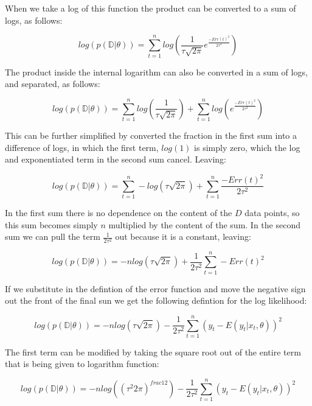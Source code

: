 \documentclass[12pt,a4paper]{article}
\numberwithin{equation}{section}
\begin{document}
When we take a log of this function the product can be converted to a sum of logs, as follows:

\begin{equation}
log(p(\mathbb{D} | \theta)) = \sum_{t=1}^n log( \frac{1}{\tau \sqrt{2\pi}} e^{\frac{-Err(t)^2}{2\tau^2}} )
\end{equation}

The product inside the internal logarithm can also be converted in a sum of logs, and separated, as follows:

\begin{equation}
log(p(\mathbb{D} | \theta)) = \sum_{t=1}^n log( \frac{1}{\tau \sqrt{2\pi}}) + \sum_{t=1}^n log( e^{\frac{-Err(t)^2}{2\tau^2}} )
\end{equation}

This can be further simplified by converted the fraction in the first sum into a difference of logs, in which the first term,
$log(1)$ is simply zero, which the log and exponentiated term in the second sum cancel. Leaving:

\begin{equation}
log(p(\mathbb{D} | \theta)) = \sum_{t=1}^n -log(\tau \sqrt{2\pi}) + \sum_{t=1}^n \frac{-Err(t)^2}{2\tau^2}
\end{equation}

In the first sum there is no dependence on the content of the $D$ data points, so this sum becomes simply $n$ multiplied
by the content of the sum. In the second sum we can pull the term $\frac{1}{2\tau^2}$ out because it is a constant, leaving:

\begin{equation}
log(p(\mathbb{D} | \theta)) = - n log(\tau \sqrt{2\pi}) + \frac{1}{2\tau^2} \sum_{t=1}^n -Err(t)^2 
\end{equation}

If we substitute in the defintion of the error function and move the negative sign out the front of the final sun
we get the following defintion for the log likelihood:

\begin{equation}
log(p(\mathbb{D} | \theta)) = - n log(\tau \sqrt{2\pi}) - \frac{1}{2\tau^2} \sum_{t=1}^n (y_t - E(y_t|x_t,\theta))^2                
\end{equation}

The first term can be modified by taking the square root out of the entire term that is being given to logarithm function:

\begin{equation}
log(p(\mathbb{D} | \theta)) = - n log((\tau^2 2\pi)^{frac{1}{2}}) - \frac{1}{2\tau^2} \sum_{t=1}^n (y_t - E(y_t|x_t,\theta))^2
\end{equation}
\end{document}
